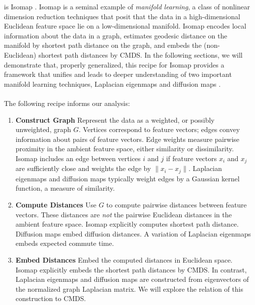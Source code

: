 \documentclass[10pt,twocolumn]{article}
\numberwithin{equation}{section}
\begin{document}
is Isomap
\cite{tenebaum00:_global_geomet_framew_nonlin_dimen_reduc}.
Isomap is a seminal example of {\em manifold learning},
a class of nonlinear dimension reduction techniques that posit
that the data in a high-dimensional Euclidean feature space lie on a 
low-dimensional manifold.  Isomap encodes local information about
the data in a graph, estimates geodesic distance on the manifold by 
shortest path distance on the graph, and embeds the (non-Euclidean)
shortest path distances by CMDS.
In the following sections, we will demonstrate that, properly generalized, 
this recipe for Isomap provides a framework that unifies and leads to deeper understanding of two important manifold learning techniques,
Laplacian eigenmaps \cite{belkin03:_laplac} and
diffusion maps \cite{coifman06:_diffus_maps}. \\ \\
%
\noindent
The following recipe informs our analysis:
%
\begin{enumerate}
\item {\bf Construct Graph} 
Represent the data as a weighted, or possibly unweighted,
  graph $G$. Vertices correspond to feature vectors; edges
  convey information about pairs of feature vectors. Edge
  weights measure pairwise proximity in the ambient feature space,
  either similarity or dissimilarity. Isomap includes an edge
  between vertices $i$ and $j$ if feature vectors $x_i$ and $x_j$ are
  sufficiently close and weights the
  edge by $\| x_i-x_j \|$.  Laplacian
  eigenmaps and diffusion maps typically weight edges by a Gaussian
  kernel function, a measure of similarity.
  
\item {\bf Compute Distances} Use $G$ to compute pairwise distances between
feature vectors.  These distances are {\em not}\/ the pairwise Euclidean
distances in the ambient feature space.  Isomap explicitly computes
  shortest path distance.  Diffusion maps embed diffusion
  distances.  A variation of Laplacian eigenmaps embeds expected
  commute time.
  
\item {\bf Embed Distances}  Embed the computed distances in Euclidean space.
Isomap explicitly embeds the shortest path distances by CMDS.  In contrast,
Laplacian eigenmaps and diffusion maps are constructed from
  eigenvectors of the normalized graph Laplacian matrix.  We will explore
  the relation of this construction to CMDS. 
  
\end{enumerate}
%
\noindent
\end{document}
